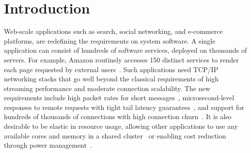 
\section{Introduction}
\label{sec:intro}


Web-scale applications such as search, social networking, and
e-commerce platforms, are redefining the requirements on system
software. A single application can consist of hundreds of software
services, deployed on thousands of servers. For example, Amazon
routinely accesses 150 distinct services to render each page requested
by external users~\cite{DBLP:conf/sosp/DeCandiaHJKLPSVV07}. Such
applications need TCP/IP networking stacks that go well beyond the
classical requirements of high streaming performance and moderate
connection scalability. The new requirements include high packet rates
for short messages~\cite{Atikoglu:2012:WAL},
microsecond-level responses to remote requests with tight tail latency
guarantees~\cite{DBLP:journals/cacm/DeanB13}, and support for hundreds
of thousands of connections with high connection
churn~\cite{nishtala2013scaling}. It is also desirable
to be elastic in resource usage, allowing other applications to use
any available cores and memory in a shared
cluster~\cite{nishtala2013scaling} or enabling cost reduction through
power management~\cite{DBLP:journals/computer/BarrosoH07}.



